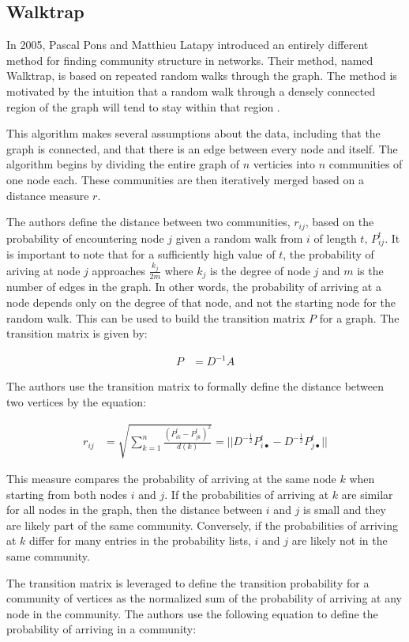 \documentclass{article}
\begin{document}
    \subsection{Walktrap}
    In 2005, Pascal Pons and Matthieu Latapy introduced an entirely different method for finding community structure in networks. Their method, named Walktrap, is based on repeated random walks through the graph. The method is motivated by the intuition that a random walk through a densely connected region of the graph will tend to stay within that region \cite{10.1007/11569596_31}.
    \par
    This algorithm makes several assumptions about the data, including that the graph is connected, and that there is an edge between every node and itself. The algorithm begins by dividing the entire graph of $n$ verticies into $n$ communities of one node each. These communities are then iteratively merged based on a distance measure $r$.
    \par
    The authors define the distance between two communities, $r_{ij}$, based on the probability of encountering node $j$ given a random walk from $i$ of length $t$, $P^t_{ij}$. It is important to note that for a sufficiently high value of $t$, the probability of ariving at node $j$ approaches $\frac{k_j}{2m}$ where $k_j$ is the degree of node $j$ and $m$ is the number of edges in the graph. In other words, the probability of arriving at a node depends only on the degree of that node, and not the starting node for the random walk. This can be used to build the transition matrix $P$ for a graph. The transition matrix is given by:

    \begin{align}
        P &= D^{-1}A
    \end{align}

    The authors use the transition matrix to formally define the distance between two vertices by the equation:

    \begin{align}
        r_{ij} &= \sqrt{\sum^n_{k=1}{\frac{(P^t_{ik} - P^t_{jk})^2}{d(k)}}} = ||D^{-\frac{1}{2}}P^t_{i\bullet} - D^{-\frac{1}{2}}P^t_{j\bullet}||
    \end{align}

    This measure compares the probability of arriving at the same node $k$ when starting from both nodes $i$ and $j$. If the probabilities of arriving at $k$ are similar for all nodes in the graph, then the distance between $i$ and $j$ is small and they are likely part of the same community. Conversely, if the probabilities of arriving at $k$ differ for many entries in the probability lists, $i$ and $j$ are likely not in the same community.
    \par
    The transition matrix is leveraged to define the transition probability for a community of vertices as the normalized sum of the probability of arriving at any node in the community. The authors use the following equation to define the probability of arriving in a community:
\end{document}
